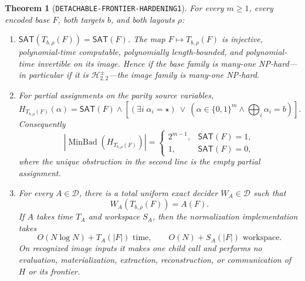 \documentclass[11pt]{article}
\newtheorem{theorem}{Theorem}
\newcommand{\SAT}{\mathsf{SAT}}
\newcommand{\Hsigned}{\mathcal H^{\pm}_{2,2}}
\begin{document}
\begin{theorem}[\texttt{DETACHABLE-FRONTIER-HARDENING1}]
For every \(m\ge1\), every encoded base \(F\), both targets \(b\), and both
layouts \(\rho\):
\begin{enumerate}[label=(\roman*),leftmargin=2em]
\item \(\SAT(T_{b,\rho}(F))=\SAT(F)\).  The map \(F\mapsto T_{b,\rho}(F)\)
is injective, polynomial-time computable, polynomially length-bounded, and
polynomial-time invertible on its image.  Hence if the base family is
many-one NP-hard---in particular if it is \(\Hsigned\)---the image family is
many-one NP-hard.
\item For partial assignments on the parity source variables,
\[
H_{T_{b,\rho}(F)}(\alpha)
=\SAT(F)\wedge
\left[
(\exists i\;\alpha_i=\star)
\ \vee\
(\alpha\in\{0,1\}^m\wedge\bigoplus_i\alpha_i=b)
\right].
\]
Consequently
\[
|\operatorname{MinBad}(H_{T_{b,\rho}(F)})|
=\begin{cases}
2^{m-1},&\SAT(F)=1,\\
1,&\SAT(F)=0,
\end{cases}
\]
where the unique obstruction in the second line is the empty partial
assignment.
\item For every \(A\in\mathcal D\), there is a total uniform exact decider
\(W_A\in\mathcal D\) such that
\[
 W_A(T_{b,\rho}(F))=A(F).
\]
If \(A\) takes time \(T_A\) and workspace \(S_A\), then the normalization
implementation takes
\[
O(N\log N)+T_A(|F|)\text{ time},\qquad O(N)+S_A(|F|)\text{ workspace}.
\]
On recognized image inputs it makes one child call and performs no evaluation,
materialization, extraction, reconstruction, or communication of \(H\) or
its frontier.
\end{enumerate}
\end{theorem}
\end{document}
